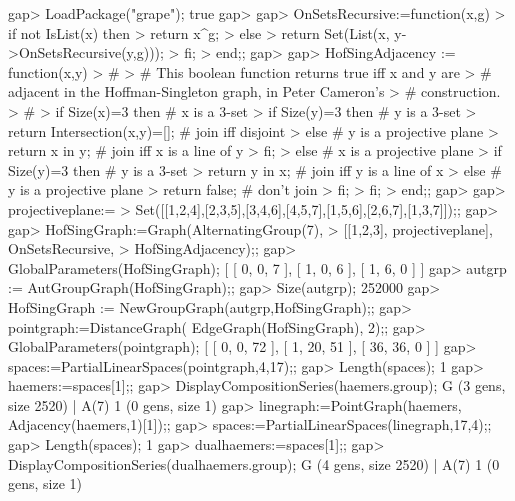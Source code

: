 \beginexample
gap> LoadPackage("grape");
true
gap> 
gap> OnSetsRecursive:=function(x,g)
> if not IsList(x) then
>   return x^g;     
> else
>   return Set(List(x, y->OnSetsRecursive(y,g)));
> fi;
> end;;
gap> 
gap> HofSingAdjacency := function(x,y)
> #
> # This boolean function returns  true  iff  x  and  y  are 
> # adjacent in the Hoffman-Singleton graph, in Peter Cameron's
> # construction.
> #
> if Size(x)=3 then                  # x is a 3-set
>    if Size(y)=3 then               # y is a 3-set
>       return Intersection(x,y)=[]; # join iff disjoint
>    else                            # y is a projective plane
>       return x in y;               # join iff x is a line of y
>    fi;
> else                               # x is a projective plane
>    if Size(y)=3 then               # y is a 3-set
>       return y in x;               # join iff y is a line of x
>    else                            # y is a projective plane
>       return false;                # don't join
>    fi;
> fi;
> end;;
gap> 
gap> projectiveplane:=
>    Set([[1,2,4],[2,3,5],[3,4,6],[4,5,7],[1,5,6],[2,6,7],[1,3,7]]);;
gap> 
gap> HofSingGraph:=Graph(AlternatingGroup(7), 
>                     [[1,2,3], projectiveplane], OnSetsRecursive,
>                     HofSingAdjacency);;
gap> GlobalParameters(HofSingGraph);
[ [ 0, 0, 7 ], [ 1, 0, 6 ], [ 1, 6, 0 ] ]
gap> autgrp := AutGroupGraph(HofSingGraph);;
gap> Size(autgrp);
252000
gap> HofSingGraph := NewGroupGraph(autgrp,HofSingGraph);;
gap> pointgraph:=DistanceGraph( EdgeGraph(HofSingGraph), 2);;
gap> GlobalParameters(pointgraph);
[ [ 0, 0, 72 ], [ 1, 20, 51 ], [ 36, 36, 0 ] ]
gap> spaces:=PartialLinearSpaces(pointgraph,4,17);;
gap> Length(spaces);
1
gap> haemers:=spaces[1];;
gap> DisplayCompositionSeries(haemers.group);
G (3 gens, size 2520)
 | A(7)
1 (0 gens, size 1)
gap> linegraph:=PointGraph(haemers, Adjacency(haemers,1)[1]);;
gap> spaces:=PartialLinearSpaces(linegraph,17,4);;
gap> Length(spaces);
1
gap> dualhaemers:=spaces[1];;
gap> DisplayCompositionSeries(dualhaemers.group);
G (4 gens, size 2520)
 | A(7)
1 (0 gens, size 1)
\endexample
